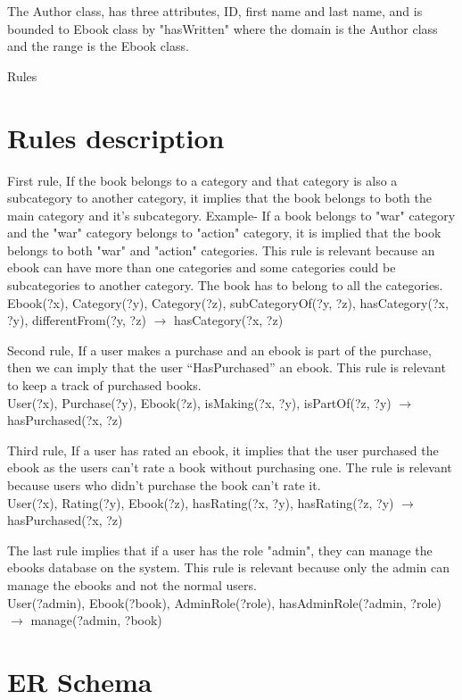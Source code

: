 ﻿\documentclass[a4paper,11pt]{article}
\begin{document}
The Author class, has three attributes, ID, first name and last name, and is bounded to Ebook class by "hasWritten" where the domain is the Author class and the range is the Ebook class. 

Rules

\section{Rules description}
First rule, If the book belongs to a category and that category is also a subcategory to another category, it implies that the book belongs to both the main category and it's subcategory. Example- If a book belongs to "war" category and the "war" category belongs to "action" category, it is implied that the book belongs to both "war" and "action" categories. This rule is relevant because an ebook can have more than one categories and some categories could be subcategories to another category. The book has to belong to all the categories.\\
Ebook(?x), Category(?y), Category(?z), subCategoryOf(?y, ?z), hasCategory(?x, ?y), differentFrom(?y, ?z) $\rightarrow$ hasCategory(?x, ?z)

Second rule, If a user makes a purchase and an ebook is part of the purchase, then we can imply that the user “HasPurchased” an ebook. This rule is relevant to keep a track of purchased books. \\
User(?x), Purchase(?y), Ebook(?z), isMaking(?x, ?y), isPartOf(?z, ?y) $\rightarrow$ hasPurchased(?x, ?z)

Third rule, If a user has rated an ebook, it implies that the user purchased the ebook as the users can't rate a book without purchasing one. The rule is relevant because users who didn't purchase the book can't rate it. \\

User(?x), Rating(?y), Ebook(?z), hasRating(?x, ?y), hasRating(?z, ?y) $\rightarrow$ hasPurchased(?x, ?z)

The last rule implies that if a user has the role "admin", they can manage the ebooks database on the system. This rule is relevant because only the admin can manage the ebooks and not the normal users. \\
User(?admin), Ebook(?book), AdminRole(?role), hasAdminRole(?admin, ?role) $\rightarrow$ manage(?admin, ?book)

\section{ER Schema}
\end{document}
